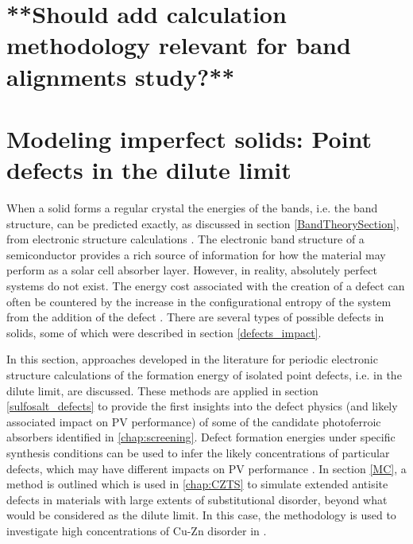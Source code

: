 \documentclass[11pt, twoside]{report}
\begin{document}
\section{**Should add calculation methodology relevant for band alignments study?**}


\section{Modeling imperfect solids: Point defects in the dilute limit}\label{defects_methods}
When a solid forms a regular crystal the energies of the bands, i.e. the band structure, can be predicted exactly, as discussed in section \ref{BandTheorySection}, from electronic structure calculations \cite{Nelson3}.
The electronic band structure of a semiconductor provides a rich source of information for how the material may perform as a solar cell absorber layer. However, in reality, absolutely perfect systems do not exist. The energy cost associated with the creation of a defect can often be countered by the increase in the configurational entropy of the system from the addition of the defect \cite{AshcroftMermin_general}.
There are several types of possible defects in solids, some of which were described in section \ref{defects_impact}. 

In this section, approaches developed in the literature for periodic electronic structure calculations of the formation energy of isolated point defects, i.e. in the dilute limit, are discussed. 
These methods are applied in section \ref{sulfosalt_defects} to provide the first insights into the defect physics (and likely associated impact on PV performance) of some of the candidate photoferroic absorbers identified in \autoref{chap:screening}. 
Defect formation energies under specific synthesis conditions can be used to infer the likely concentrations of particular defects, which may have different impacts on PV performance \cite{Aron_defect_tolerance}. 
In section \ref{MC}, a method is outlined which is used in \autoref{chap:CZTS} to simulate extended antisite defects in materials with large extents of substitutional disorder, beyond what would be considered as the dilute limit. In this case, the methodology is used to investigate high concentrations of Cu-Zn disorder in {\CZTS}. 
\end{document}

